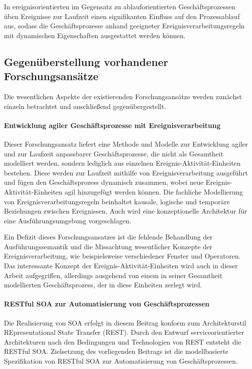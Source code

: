 In ereignisorientierten im Gegensatz zu ablauforientierten Geschäftsprozessen üben Ereignisse zur Laufzeit einen signifikanten Einfluss auf den Prozessablauf aus, sodass die Geschäftsprozesse anhand geeigneter Ereignisverarbeitungsregeln mit dynamischen Eigenschaften ausgestattet werden können. 


\subsection{Gegenüberstellung vorhandener Forschungsansätze}
Die wesentlichen Aspekte der existierenden Forschungsansätze werden zunächst einzeln betrachtet und anschließend gegenübergestellt.


\paragraph{Entwicklung agiler Geschäftsprozesse mit Ereignisverarbeitung}
Dieser Forschungsansatz liefert eine Methode und Modelle zur Entwicklung agiler und zur Laufzeit anpassbarer Geschäftsprozesse, die nicht als Gesamtheit modelliert werden, sondern lediglich aus einzelnen Ereignis-Aktivität-Einheiten bestehen. Diese werden zur Laufzeit mithilfe von Ereignisverarbeitung ausgeführt und fügen den Geschäftsprozess dynamisch zusammen, wobei neue Ereignis-Aktivität-Einheiten agil hinzugefügt werden können. Die fachliche Modellierung von Ereignisverarbeitungsregeln beinhaltet kausale, logische und temporäre Beziehungen zwischen Ereignissen. Auch wird eine konzeptionelle Architektur für eine Ausführungsumgebung vorgeschlagen. 

Ein Defizit dieses Forschungsansatzes ist die fehlende Behandlung der Ausführungssemantik und die Missachtung wesentlicher Konzepte der Ereignisverarbeitung, wie beispielsweise verschiedener Fenster und Operatoren. Das interessante Konzept der Ereignis-Aktivität-Einheiten wird auch in dieser Arbeit aufgegriffen, allerdings ausgehend von einem in seiner Gesamtheit modellierten Geschäftsprozess, der in diese Einheiten zerlegt wird.
\cite{Alexopoulou.2008}

\paragraph{RESTful SOA zur Automatisierung von Geschäftsprozessen}
Die Realisierung von SOA erfolgt in diesem Beitrag konform zum Architekturstil REpresentational State Transfer (REST).
Durch den Entwurf serviceorientierter Architekturen nach den Bedingungen und Technologien von REST entsteht die RESTful SOA. Zielsetzung des vorliegenden Beitrags ist die modellbasierte Spezifikation von RESTful SOA zur Automatisierung von Geschäftsprozessen. 

